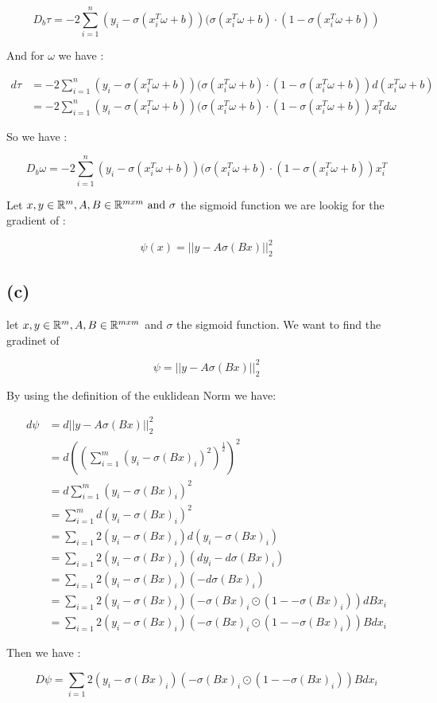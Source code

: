  \[
 D_b \tau =   -2\sum_{i=1}^n(y_i-\sigma(x_i^T\omega +b))(\sigma(x_i^T\omega +b)\cdot(1-\sigma(x_i^T\omega +b))  
 \]

 And for $\omega$ we have :

\begin{align*}
    d\tau       &=-2\sum_{i=1}^n(y_i-\sigma(x_i^T\omega +b))(\sigma(x_i^T\omega +b)\cdot(1-\sigma(x_i^T\omega +b))d(x_i^T\omega +b)  \\
                &=-2\sum_{i=1}^n(y_i-\sigma(x_i^T\omega +b))(\sigma(x_i^T\omega +b)\cdot(1-\sigma(x_i^T\omega +b))x_i^T d\omega
\end{align*}

So we have :

\[
    D_b \omega =    -2\sum_{i=1}^n(y_i-\sigma(x_i^T\omega +b))(\sigma(x_i^T\omega +b)\cdot(1-\sigma(x_i^T\omega +b))x_i^T 
\]



Let $x,y \in \mathbb{R}^m, A, B \in \mathbb{R}^{mxm}\text{ and }\sigma $ the sigmoid function we are lookig for the gradient of :

\[
\psi(x)= ||y-A\sigma(Bx)||_2^2    
\]


\subsection*{(c)}
let $x,y \in \mathbb{R}^m, A,B \in \mathbb{R}^{mxm}$ and $\sigma$ the sigmoid function. We want to find the gradinet of 

\[
\psi  = ||y-A\sigma(Bx)||_2^2    
\]

By using the definition of the euklidean Norm we have:

\begin{align*}
    d\psi   &=  d||y-A\sigma(Bx)||_2^2\\
            &= d((\sum_{i=1}^m (y_i -\sigma(Bx)_i)^2)^{\frac{1}{2}})^2\\
            &=  d\sum_{i=1}^m (y_i -\sigma(Bx)_i)^2\\
            &=  \sum_{i=1}^m d(y_i -\sigma(Bx)_i)^2 \\
            &=   \sum_{i=1} 2(y_i -\sigma(Bx)_i)d(y_i -\sigma(Bx)_i)\\
            &=   \sum_{i=1} 2(y_i -\sigma(Bx)_i)(dy_i -d\sigma(Bx)_i)\\
            &=   \sum_{i=1} 2(y_i -\sigma(Bx)_i)(-d\sigma(Bx)_i)\\
            &=   \sum_{i=1} 2(y_i -\sigma(Bx)_i)(-\sigma(Bx)_i\odot(1--\sigma(Bx)_i))dBx_i \\
            &=   \sum_{i=1} 2(y_i -\sigma(Bx)_i)(-\sigma(Bx)_i\odot(1--\sigma(Bx)_i))Bdx_i 
\end{align*}

Then we have : 

\[
D\psi =     \sum_{i=1} 2(y_i -\sigma(Bx)_i)(-\sigma(Bx)_i\odot(1--\sigma(Bx)_i))Bdx_i 
\]



